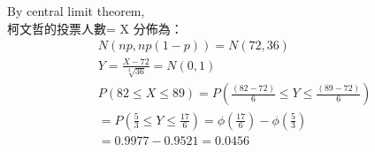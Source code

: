 \documentclass{article}
\begin{document}
\fontsize{15pt}{20pt}\selectfont

\begin{CJK}{UTF8}{bsmi} %
\noindent

By central limit theorem,\\
柯文哲的投票人數= X 分佈為：
\begin{align*}
&N(np, np(1- p)) = N(72, 36)\\
&Y = \frac{X - 72}{\sqrt[2]{36}} = N(0, 1) \\
&P(82 \leq X \leq 89) = P(\frac{(82-72)}{6} \leq Y \leq \frac{(89-72)}{6})\\
&= P(\frac{5}{3} \leq Y \leq \frac{17}{6}) = \phi(\frac{17}{6}) - \phi(\frac{5}{3})\\
&= 0.9977 - 0.9521
= 0.0456
\end{align*}
\end{CJK} %
\end{document}

